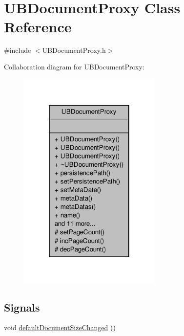 \hypertarget{class_u_b_document_proxy}{\section{U\-B\-Document\-Proxy Class Reference}
\label{de/db4/class_u_b_document_proxy}
}


{\ttfamily \#include $<$U\-B\-Document\-Proxy.\-h$>$}



Collaboration diagram for U\-B\-Document\-Proxy\-:
\nopagebreak
\begin{figure}[H]
\begin{center}
\leavevmode
\includegraphics[width=202pt]{dc/d24/class_u_b_document_proxy__coll__graph}
\end{center}
\end{figure}
\subsection*{Signals}
\begin{DoxyCompactItemize}
\item 
void \hyperlink{class_u_b_document_proxy_a19487b8fe303e9a06b08ca5bd0fc505c}{default\-Document\-Size\-Changed} ()
\end{DoxyCompactItemize}

